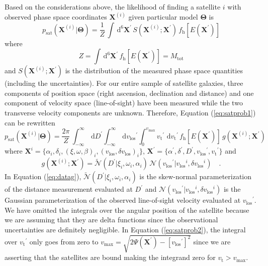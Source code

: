 \documentclass[preprint,12pt]{aastex}
\newcommand{\eqlabel}[1]{\label{eq:#1}}
\newcommand{\eq}[1]{Equation (\ref{eq:#1})}
\newcommand{\dd}{\,\mathrm{d}}
\newcommand{\bvec}[1]{\ensuremath{\boldsymbol{#1}}}
\newcommand{\normal}[3]{\ensuremath{\mathcal{N} (#1 | #2, #3)}}
\newcommand{\skewnormal}[4]{\ensuremath{\tilde{\mathcal{N}} (#1 | #2, #3, #4)}}
\renewcommand{\vector}[1]{\ensuremath{\bvec{#1}}}
\newcommand{\model}{\vector{\Theta}}
\newcommand{\data}{\vector{X}}
\newcommand{\prob}{\ensuremath{p}}
\newcommand{\pr}{\prob}
\newcommand{\df}{f}
\newcommand{\dfs}[1]{\df_\mathrm{#1}}
\newcommand{\dfhalo}{\dfs{\halo}}
\newcommand{\E}{\ensuremath{E}}
\newcommand{\halo}{\mathrm{h}}
\newcommand{\sat}{\mathrm{sat}}
\newcommand{\vlos}{\ensuremath{v_\mathrm{los}}}
\newcommand{\vtan}{\ensuremath{v_\mathrm{t}}}
\begin{document}
Based on the considerations above, the likelihood of finding a
satellite $i$ with observed phase space coordinates $\data^{(i)}$ given
particular model $\model$ is
\begin{equation}
    \eqlabel{satprob1}
    \pr_\sat (\data^{(i)} | \model) = \frac{1}{Z} \,
        \int \dd^6 \data^\prime \, S(\data^{(i)}; \data^\prime)
            \, \dfhalo [ \E (\data^\prime) ]
\end{equation}
where
\begin{equation}
    Z = \int \dd^6 \data^\prime \, \dfhalo [\E (\data^\prime)] = M_\mathrm{tot}
\end{equation}
and $S(\data^{(i)}; \data^\prime)$ is the distribution of the measured
phase space quantities (including the uncertainties).  For our entire
sample of satellite galaxies, three components of position space (right
ascension, declination and distance) and one component of velocity space
(line-of-sight) have been measured while the two transverse velocity
components are unknown.  Therefore, \eq{satprob1} can be rewritten
\begin{equation}
    \eqlabel{satprob2}
    \pr_\sat (\data^{(i)} | \model)
        = \frac{2 \pi}{Z} \,
            \int_{-\infty}^{\infty} \dd D^\prime
            \int_{-\infty}^{\infty} \dd \vlos^\prime
            \int_0 ^{v_\mathrm{max}} \vtan^\prime \, \dd \vtan^\prime
            \, \dfhalo \left [\E (\data^\prime)\right ]
                \, g (\data^{(i)}; \data^\prime)
\end{equation}
where $\data^{i} = \{\alpha_i, \delta_i, (\xi, \omega, \beta)_i,
(\vlos, \delta\vlos)_i \}$, $\data^\prime = \{ \alpha^\prime, \delta^\prime,
D^\prime, \vlos^\prime, \vtan^\prime \}$ and
\begin{equation}\eqlabel{datag}
    g (\data^{(i)}; \data^\prime)
    = \skewnormal{D^\prime}{\xi_i}{\omega_i}{\alpha_i} \,
        \normal{\vlos^\prime}{\vlos^{i}}{\delta\vlos^i} \quad .
\end{equation}
In \eq{datag}, \skewnormal{D^\prime}{\xi_i}{\omega_i}{\alpha_i} is the
skew-normal parameterization of the distance measurement evaluated at
$D^\prime$ and \normal{\vlos^\prime}{\vlos^{i}}{\delta\vlos^i} is the
Gaussian parameterization of the observed line-of-sight velocity evaluated
at $\vlos^\prime$. We have omitted the integrals over the angular position
of the satellite because we are assuming that they are delta functions since
the observational uncertainties are definitely negligible. In \eq{satprob2},
the integral over $\vtan^\prime$ only goes from zero to
$v_\mathrm{max} = \sqrt{2 \Psi(\data^\prime) - [\vlos^\prime]^2}$ since we
are asserting that the satellites are bound making the integrand zero for
$\vtan > v_\mathrm{max}$.
\end{document}
